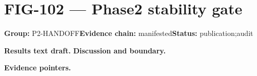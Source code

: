 \clearpage
\section{FIG-102 --- Phase2 stability gate}
\label{figpage:fig-102}
\textbf{Group:} P2-HANDOFF\quad \textbf{Evidence chain:} manifested\quad \textbf{Status:} publication;audit

\textbf{Results text draft.} 
\textbf{Discussion and boundary.} 


\textbf{Evidence pointers.}



\vfill
